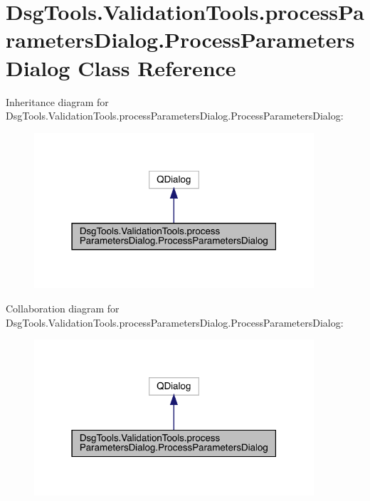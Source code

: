 \hypertarget{class_dsg_tools_1_1_validation_tools_1_1process_parameters_dialog_1_1_process_parameters_dialog}{}\section{Dsg\+Tools.\+Validation\+Tools.\+process\+Parameters\+Dialog.\+Process\+Parameters\+Dialog Class Reference}
\label{class_dsg_tools_1_1_validation_tools_1_1process_parameters_dialog_1_1_process_parameters_dialog}


Inheritance diagram for Dsg\+Tools.\+Validation\+Tools.\+process\+Parameters\+Dialog.\+Process\+Parameters\+Dialog\+:
\nopagebreak
\begin{figure}[H]
\begin{center}
\leavevmode
\includegraphics[width=295pt]{class_dsg_tools_1_1_validation_tools_1_1process_parameters_dialog_1_1_process_parameters_dialog__inherit__graph}
\end{center}
\end{figure}


Collaboration diagram for Dsg\+Tools.\+Validation\+Tools.\+process\+Parameters\+Dialog.\+Process\+Parameters\+Dialog\+:
\nopagebreak
\begin{figure}[H]
\begin{center}
\leavevmode
\includegraphics[width=295pt]{class_dsg_tools_1_1_validation_tools_1_1process_parameters_dialog_1_1_process_parameters_dialog__coll__graph}
\end{center}
\end{figure}
